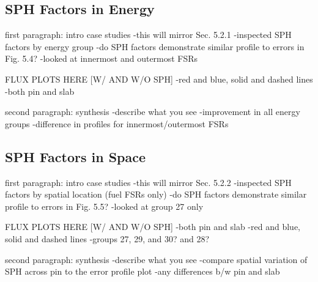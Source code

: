 \subsection{SPH Factors in Energy}
\label{subsubsec:chap6-sph-energy}

first paragraph: intro case studies
-this will mirror Sec. 5.2.1
-inspected SPH factors by energy group
-do SPH factors demonstrate similar profile to errors in Fig. 5.4?
-looked at innermost and outermost FSRs

FLUX PLOTS HERE [W/ AND W/O SPH]
-red and blue, solid and dashed lines
-both pin and slab

second paragraph: synthesis
-describe what you see
-improvement in all energy groups
-difference in profiles for innermost/outermost FSRs

\subsection{SPH Factors in Space}
\label{subsubsec:chap6-sph-space}

first paragraph: intro case studies
-this will mirror Sec. 5.2.2
-inspected SPH factors by spatial location (fuel FSRs only)
-do SPH factors demonstrate similar profile to errors in Fig. 5.5?
-looked at group 27 only

FLUX PLOTS HERE [W/ AND W/O SPH]
-both pin and slab
-red and blue, solid and dashed lines
-groups 27, 29, and 30? and 28?

second paragraph: synthesis
-describe what you see
-compare spatial variation of SPH across pin to the error profile plot
-any differences b/w pin and slab



